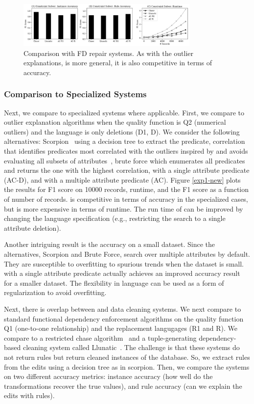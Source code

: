 \begin{figure}
    \centering
    \includegraphics[width=0.8\textwidth]{exp/exp2-new.png}
    \caption{\small Comparison with FD repair systems. As with the outlier explanations, \sys is more general, it is also competitive in terms of accuracy.\label{exp2-new}}
\end{figure}

\subsubsection{Comparison to Specialized Systems}
Next, we compare \sys to specialized systems where applicable.  First, we compare \sys to outlier explanation algorithms when the quality function is Q2 (numerical outliers) and the language is only deletions (D1, D). We consider the following alternatives: Scorpion~\cite{scorpion} using a decision tree to extract the predicate, correlation that identifies predicates most correlated with the outliers inspired by and avoids evaluating all subsets of attributes~\cite{bailis2016macrobase}, brute force which enumerates all predicates and returns the one with the highest correlation, \sys with a single attribute predicate (AC-D), and \sys with a multiple attribute predicate (AC). Figure \ref{exp1-new} plots the results for F1 score on 10000 records, runtime, and the F1 score as a function of number of records.
\sys is competitive in terms of accuracy in the specialized cases, but is more expensive in terms of runtime.
The run time of \sys can be improved by changing the language specification (e.g., restricting the search to a single attribute deletion).

Another intriguing result is the accuracy on a small dataset.
Since the alternatives, Scorpion and Brute Force, search over multiple attributes by default. They are susceptible to overfitting to spurious trends when the dataset is small.
\sys with a single attribute predicate actually achieves an improved accuracy result for a smaller dataset.
The flexibility in language can be used as a form of regularization to avoid overfitting.

Next, there is overlap between \sys and data cleaning systems. We next compare to standard functional dependency enforcement algorithms on the quality function Q1 (one-to-one relationship) and the replacement langugages (R1 and R). We compare \sys to a restricted chase algorithm~\cite{benedikt2017benchmarking} and a tuple-generating dependency-based cleaning system called Llunatic~\cite{DBLP:conf/sigmod/DallachiesaEEEIOT13}. The challenge is that these systems do not return rules but return cleaned instances of the database. So, we extract rules from the edits using a decision tree as in scorpion. Then, we compare the systems on two different accuracy metrics: instance accuracy (how well do the transformations recover the true values), and rule accuracy (can we explain the edits with rules). 

